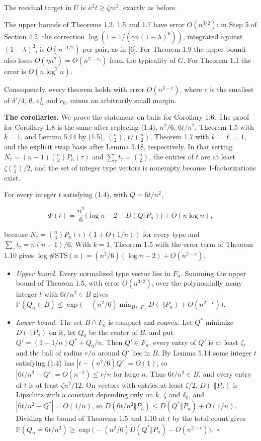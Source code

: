 \documentclass[english,11pt,a4paper]{article}
\providecommand{\tightlist}{\setlength{\itemsep}{0pt}\setlength{\parskip}{0pt}}
\newcounter{none}
\begin{document}
The residual target in \(U\) is \(\kappa^2t\ge\zeta m^2\), exactly as before.

The upper bounds of Theorems 1.2, 1.5 and 1.7 have error \(O(n^{3/2})\): in Step 5 of Section 4.2, the correction \(\log(1+1/(\gamma n(1-\lambda)^6))\), integrated against \((1-\lambda)^2\), is \(O(n^{-1/2})\) per pair, as in {[}6{]}. For Theorem 1.9 the upper bound also loses \(O(\eta n^2)=O(n^{2-c_0})\) from the typicality of \(G\). For Theorem 1.1 the error is \(O(n\log^2n)\).

Consequently, every theorem holds with error \(O(n^{2-c})\), where \(c\) is the smallest of \(\delta'/4\), \(\theta\), \(\varepsilon_G^4\) and \(c_0\), minus an arbitrarily small margin.

\textbf{The corollaries.} We prove the statement on balls for Corollary 1.6. The proof for Corollary 1.8 is the same after replacing (1.4), \(n^2/6\), \(6t/n^2\), Theorem 1.5 with \(k=1\), and Lemma 5.14 by (1.5), \(\binom n2\), \(t/\binom n2\), Theorem 1.7 with \(k=\ell=1\), and the explicit swap basis after Lemma 5.18, respectively. In that setting \(N_\tau=(n-1)\binom n2P_n(\tau)\) and \(\sum_\tau t_\tau=\binom n2\), the entries of \(t\) are at least \(\zeta\binom n2/2\), and the set of integer type vectors is nonempty because 1-factorizations exist.

For every integer \(t\) satisfying (1.4), with \(Q=6t/n^2\),

\nopagebreak[4]
\[\Phi(t)=\frac{n^2}{6}\bigl(\log n-2-D(Q\Vert P_n)\bigr)+O(n\log n),\]

because \(N_\tau=\binom n3P_n(\tau)(1+O(1/n))\) for every type and \(\sum_\tau t_\tau=n(n-1)/6\). With \(k=1\), Theorem 1.5 with the error term of Theorem 1.10 gives \(\log\#\mathrm{STS}(n)=(n^2/6)(\log n-2)+O(n^{2-c})\).

\begin{itemize}
\tightlist
\item
  \emph{Upper bound.} Every normalized type vector lies in \(F_n\). Summing the upper bound of Theorem 1.5, with error \(O(n^{3/2})\), over the polynomially many integer \(t\) with \(6t/n^2\in B\) gives \(\mathbb P(Q_n\in B)\le\exp\bigl(-(n^2/6)\min_{B\cap F_n}D(\cdot\Vert P_n)+O(n^{2-c})\bigr)\).
\item
  \emph{Lower bound.} The set \(B\cap F_n\) is compact and convex. Let \(Q^*\) minimize \(D(\cdot\Vert P_n)\) on it, let \(Q_0\) be the center of \(B\), and put \(Q'=(1-1/n)Q^*+Q_0/n\). Then \(Q'\in F_n\), every entry of \(Q'\) is at least \(\zeta\), and the ball of radius \(r/n\) around \(Q'\) lies in \(B\). By Lemma 5.14 some integer \(t\) satisfying (1.4) has \(|t-(n^2/6)Q'|=O(1)\), so \(|6t/n^2-Q'|=O(n^{-2})\le r/n\) for large \(n\). Thus \(6t/n^2\in B\), and every entry of \(t\) is at least \(\zeta n^2/12\). On vectors with entries at least \(\zeta/2\), \(D(\cdot\Vert P_n)\) is Lipschitz with a constant depending only on \(k\), \(\zeta\) and \(\delta_0\), and \(|6t/n^2-Q^*|=O(1/n)\), so \(D(6t/n^2\Vert P_n)\le D(Q^*\Vert P_n)+O(1/n)\). Dividing the bound of Theorems 1.5 and 1.10 at \(t\) by the total count gives \(\mathbb P(Q_n=6t/n^2)\ge\exp\bigl(-(n^2/6)D(Q^*\Vert P_n)-O(n^{2-c})\bigr)\).~\(\square\)
\end{itemize}
\end{document}
